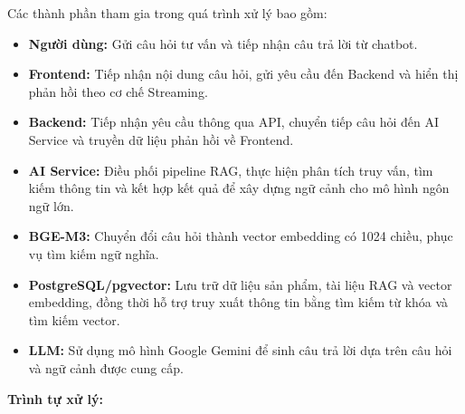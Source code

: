 \documentclass{report}
\begin{document}
Các thành phần tham gia trong quá trình xử lý bao gồm:

\begin{itemize}
    \item \textbf{Người dùng:} Gửi câu hỏi tư vấn và tiếp nhận câu trả lời từ chatbot.
    \item \textbf{Frontend:} Tiếp nhận nội dung câu hỏi, gửi yêu cầu đến Backend và hiển thị phản hồi theo cơ chế Streaming.
    \item \textbf{Backend:} Tiếp nhận yêu cầu thông qua API, chuyển tiếp câu hỏi đến AI Service và truyền dữ liệu phản hồi về Frontend.
    \item \textbf{AI Service:} Điều phối pipeline RAG, thực hiện phân tích truy vấn, tìm kiếm thông tin và kết hợp kết quả để xây dựng ngữ cảnh cho mô hình ngôn ngữ lớn.
    \item \textbf{BGE-M3:} Chuyển đổi câu hỏi thành vector embedding có 1024 chiều, phục vụ tìm kiếm ngữ nghĩa.
    \item \textbf{PostgreSQL/pgvector:} Lưu trữ dữ liệu sản phẩm, tài liệu RAG và vector embedding, đồng thời hỗ trợ truy xuất thông tin bằng tìm kiếm từ khóa và tìm kiếm vector.
    \item \textbf{LLM:} Sử dụng mô hình Google Gemini để sinh câu trả lời dựa trên câu hỏi và ngữ cảnh được cung cấp.
\end{itemize}

\textbf{Trình tự xử lý:}
\end{document}
